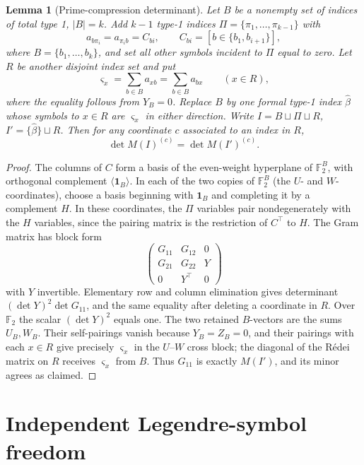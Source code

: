 \documentclass[11pt,a4paper]{article}
\newtheorem{lemma}[theorem]{Lemma}
\theoremstyle{definition}
\newcommand{\FF}{\mathbb F_2}
\newcommand{\one}{\boldsymbol{1}}
\begin{document}
\begin{lemma}[Prime-compression determinant]\label{lem:compress}
Let $B$ be a nonempty set of indices of total type 1,
$|B|=k$.  Add $k-1$ type-1 indices
$\Pi=\{\pi_1,\ldots,\pi_{k-1}\}$ with
\[
 a_{b\pi_i}=a_{\pi_i b}=C_{bi},\qquad
  C_{bi}=[b\in\{b_1,b_{i+1}\}],
\]
where $B=\{b_1,\ldots,b_k\}$, and set all other symbols
incident to $\Pi$ equal to zero.  Let $R$ be another
disjoint index set and put
\[
                  \varsigma_x=\sum_{b\in B}a_{xb}
                                =\sum_{b\in B}a_{bx}
                    \qquad(x\in R),
\]
where the equality follows from $Y_B=0$.
Replace $B$ by one formal type-1 index $\widehat\beta$
whose symbols to $x\in R$ are $\varsigma_x$ in either
direction.  Write $I=B\sqcup\Pi\sqcup R$,
$I'=\{\widehat\beta\}\sqcup R$.
Then for any coordinate $c$ associated to an index in $R$,
\[
                   \det M(I)^{(c)}=\det M(I')^{(c)}.
\]
\end{lemma}
\begin{proof}
The columns of $C$ form a basis of the even-weight
hyperplane of $\FF^B$, with orthogonal complement
$\langle\one_B\rangle$.  In each of the two copies of
$\FF^B$ (the $U$- and $W$-coordinates), choose a basis
beginning with $\one_B$ and completing it by a
complement $H$.  In these coordinates, the $\Pi$ variables
pair nondegenerately with the $H$ variables, since the
pairing matrix is the restriction of $C^\top$ to $H$.
The Gram matrix has block form
\[
 \begin{pmatrix}
 G_{11}&G_{12}&0\\G_{21}&G_{22}&Y\\0&Y^\top&0
 \end{pmatrix}
\]
with $Y$ invertible.  Elementary row and column
elimination gives determinant $(\det Y)^2\det G_{11}$,
and the same equality after deleting a coordinate in $R$.
Over $\FF$ the scalar $(\det Y)^2$ equals one.
The two retained $B$-vectors are the sums $U_B,W_B$.
Their self-pairings vanish because $Y_B=Z_B=0$,
and their pairings with each $x\in R$ give precisely
$\varsigma_x$ in the $U$--$W$ cross block; the diagonal
of the R\'edei matrix on $R$ receives $\varsigma_x$
from $B$.  Thus $G_{11}$ is exactly $M(I')$,
and its minor agrees as claimed.
\end{proof}

\section{Independent Legendre-symbol freedom}\label{sec:free}
\end{document}
